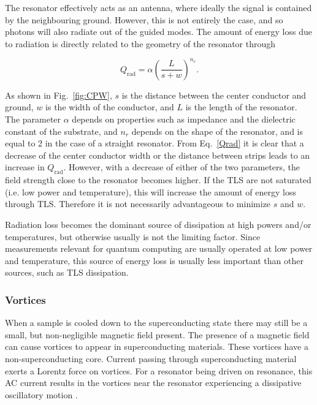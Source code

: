       The resonator effectively acts as an antenna, where ideally the signal is contained by the neighbouring ground. However, this is not entirely the case, and so photons will also radiate out of the guided modes. The amount of energy loss due to radiation is directly related to the geometry of the resonator through \cite{sage2011study,Mazin}

      \begin{equation}
          Q_\text{rad} = \alpha \left( \frac{L}{s + w}\right)^{n_r}.
          \label{Qrad}
      \end{equation}

      As shown in Fig.~\ref{fig:CPW}, $s$ is the distance between the center conductor and ground, $w$ is the width of the conductor, and $L$ is the length of the resonator. The parameter $\alpha$ depends on properties such as impedance and the dielectric constant of the substrate, and $n_r$ depends on the shape of the resonator, and is equal to 2 in the case of a straight resonator. From Eq.~\ref{Qrad} it is clear that a decrease of the center conductor width or the distance between strips leads to an increase in $Q_\text{rad}$. However, with a decrease of either of the two parameters, the field strength close to the resonator becomes higher. If the TLS are not saturated (i.e. low power and temperature), this will increase the amount of energy loss through TLS. Therefore it is not necessarily advantageous to minimize $s$ and $w$.

      Radiation loss becomes the dominant source of dissipation at high powers and/or temperatures, but otherwise usually is not the limiting factor. Since measurements relevant for quantum computing are usually operated at low power and temperature, this source of energy loss is usually less important than other sources, such as TLS dissipation.

    \subsubsection{Vortices}

      When a sample is cooled down to the superconducting state there may still be a small, but non-negligible magnetic field present. The presence of a magnetic field can cause vortices to appear in superconducting materials. These vortices have a non-superconducting core. Current passing through superconducting material exerts a Lorentz force on vortices. For a resonator being driven on resonance, this AC current results in the vortices near the resonator experiencing a dissipative oscillatory motion \cite{plourde2009microwave}.

